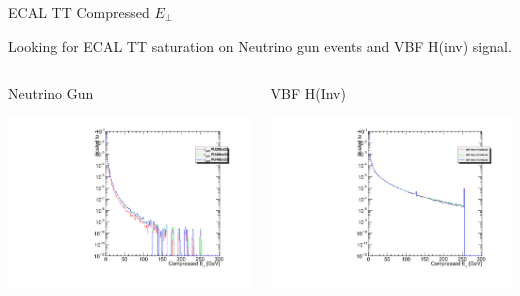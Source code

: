 \documentclass[8pt]{beamer}
\begin{document}
\begin{frame}{ECAL TT Compressed $E_{\perp}$}

Looking for ECAL TT saturation on Neutrino gun events and VBF H(inv) signal.

\begin{columns}
 
\begin{block}{Neutrino Gun}
\centering

\includegraphics[width=\linewidth]{fig/EcalTT_Val_NG.pdf}

\end{block}

\begin{block}{VBF H(Inv)}
\centering

\includegraphics[width=\linewidth]{fig/EcalTT_Val_Sig.pdf}


\end{block}
\end{columns}
\end{frame}
\end{document}
